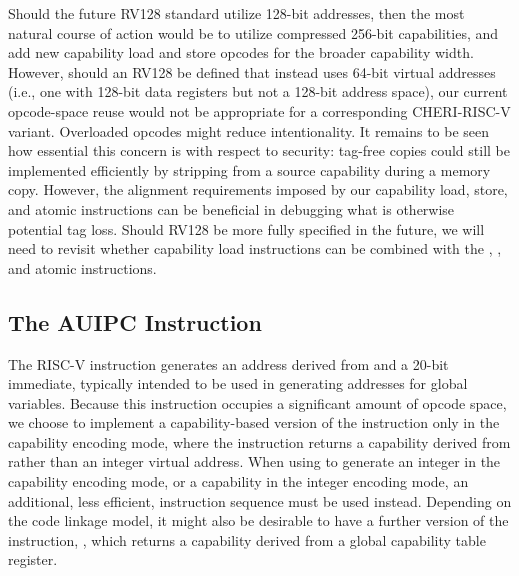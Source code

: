 Should the future RV128 standard utilize 128-bit addresses, then the most
natural course of action would be to utilize compressed 256-bit capabilities,
and add new capability load and store opcodes for the broader capability
width.
However, should an RV128 be defined that instead uses 64-bit virtual
addresses (i.e., one with 128-bit data registers but not a 128-bit address
space), our current opcode-space reuse would not be appropriate for a
corresponding CHERI-RISC-V variant.
Overloaded opcodes might reduce intentionality.
It remains to be seen how essential this
concern is with respect to security: tag-free copies could still be
implemented efficiently by stripping \cappermLC{} from a source
capability during a memory copy.
However, the alignment requirements imposed by our capability load, store,
and atomic instructions can be beneficial in debugging what is otherwise
potential tag loss.
Should RV128 be more fully specified in the future, we will need to revisit
whether capability load instructions can be combined with the
, , and atomic instructions.

\subsection{The AUIPC Instruction}
\label{section:cheri-risc-v-auipc}

The RISC-V  instruction generates an address derived
from \PC{} and a 20-bit immediate, typically intended to be used in generating
addresses for global variables.
Because this instruction occupies a significant amount of opcode space, we
choose to implement a capability-based version of the instruction only in the
capability encoding mode, where the instruction returns a capability derived
from \PCC{} rather than an integer virtual address.
When using  to generate an integer in the capability
encoding mode, or a capability in the integer encoding mode, an additional,
less efficient, instruction sequence must be used instead.
Depending on the code linkage model, it might also be desirable to have a
further version of the instruction, , which returns
a capability derived from a global capability table register.

%

